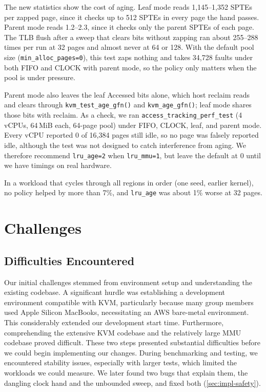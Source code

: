 \documentclass[letterpaper,twocolumn,10pt]{article}
\begin{document}
The new statistics show the cost of aging. Leaf mode reads 1{,}145--1{,}352 SPTEs
per zapped page, since it checks up to 512 SPTEs in every page the hand passes.
Parent mode reads 1.2--2.3, since it checks only the parent SPTEs of each page.
The TLB flush after a sweep that
clears bits without zapping ran about 255--288 times per run at 32 pages and
almost never at 64 or 128. With the default pool size
(\texttt{min\_alloc\_pages=0}), this test zaps nothing and takes 34{,}728 faults
under both FIFO and CLOCK with parent mode, so the policy only matters when the
pool is under pressure.

Parent mode also leaves the leaf Accessed bits alone, which host reclaim reads
and clears through \texttt{kvm\_test\_age\_gfn()} and \texttt{kvm\_age\_gfn()};
leaf mode shares those bits with reclaim. As a check, we ran
\texttt{access\_tracking\_perf\_test} (4 vCPUs, 64\,MiB each, 64-page pool)
under FIFO, CLOCK, leaf, and parent mode. Every vCPU reported 0 of 16{,}384 pages
still idle, so no page was falsely reported idle, although the test was not
designed to catch interference from aging. We therefore recommend
\texttt{lru\_age=2} when \texttt{lru\_mmu=1}, but leave the default at 0 until
we have timings on real hardware.

In a workload that cycles through all regions in order (one seed, earlier
kernel), no policy helped by more than 7\%, and \texttt{lru\_age} was about 1\%
worse at 32 pages.

\section{Challenges}

\subsection{Difficulties Encountered}

Our initial challenges stemmed from environment setup and understanding the
existing codebase. A significant hurdle was establishing a development environment
compatible with KVM, particularly because many group members used Apple Silicon
MacBooks, necessitating an AWS bare-metal environment. This considerably extended
our development start time. Furthermore, comprehending the extensive KVM codebase
and the relatively large MMU codebase proved difficult. These two steps presented
substantial difficulties before we could begin implementing our changes. During
benchmarking and testing, we encountered stability issues, especially with larger
tests, which limited the workloads we could measure. We later found two bugs that
explain them, the dangling clock hand and the unbounded sweep, and fixed both
(\cref{sec:impl-safety}).
\end{document}
